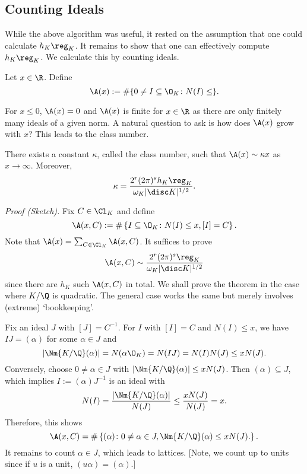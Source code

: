 \subsection{Counting Ideals}

While the above algorithm was useful, it rested on the assumption that one could calculate $h_K \reg_K$. It remains to show that one can effectively compute $h_K \reg_K$. We calculate this by counting ideals.

\begin{dfn}
Let $x \in \R$. Define
	\[
	\A(x):= \#\{ 0 \neq I \subseteq \O_K \colon N(I) \leq \}.
	\]
\end{dfn}

For $x\leq 0$, $\A(x)=0$ and $\A(x)$ is finite for $x \in \R$ as there are only finitely many ideals of a given norm. A natural question to ask is how does $\A(x)$ grow with $x$? This leads to the class number.

\begin{thm}
There exists a constant $\kappa$, called the class number, such that $\A(x) \sim \kappa x$ as $x \to \infty$. Moreover,
	\[
	\kappa= \dfrac{2^r (2\pi)^s h_K \reg_K}{\omega_K |\disc K|^{1/2}}.
	\]
\end{thm}

\noindent \emph{Proof (Sketch). } Fix $C \in \Cl_K$ and define
	\[
	\A(x,C):= \#\left\{ I \subseteq \O_K \colon N(I) \leq x, [I]=C \right\}.
	\]
Note that $\A(x)=\sum_{C \in \Cl_K} \A(x,C)$. It suffices to prove
	\[
	\A(x,C) \sim \dfrac{2^r (2\pi)^s \reg_K}{\omega_K |\disc K|^{1/2}}
	\]
since there are $h_K$ such $\A(x,C)$ in total. We shall prove the theorem in the case where $K/\Q$ is quadratic. The general case works the same but merely involves (extreme) `bookkeeping'.

Fix an ideal $J$ with $[J]=C^{-1}$. For $I$ with $[I]=C$ and $N(I) \leq x$, we have $IJ=(\alpha)$ for some $\alpha \in J$ and
	\[
	|\Nm{K/\Q}(\alpha)|= N(\alpha \O_K)= N(IJ)= N(I)N(J) \leq xN(J).
	\]
Conversely, choose $0 \neq \alpha \in J$ with $|\Nm{K/\Q}(\alpha)| \leq x N(J)$. Then $(\alpha) \subseteq J$, which implies $I:=(\alpha)J^{-1}$ is an ideal with
	\[
	N(I)= \dfrac{|\Nm{K/\Q}(\alpha)|}{N(J)} \leq \dfrac{xN(J)}{N(J)}= x.
	\]
Therefore, this shows
	\[
	\A(x,C)= \# \left\{ (\alpha) \colon 0 \neq \alpha \in J, \Nm{K/\Q}(\alpha) \leq x N(J). \right\}.
	\]
It remains to count $\alpha \in J$, which leads to lattices. [Note, we count up to units since if $u$ is a unit, $(u\alpha)=(\alpha)$.] \\

